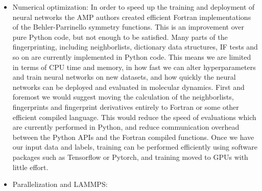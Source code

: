 \begin{itemize}
    \item Numerical optimization:
        In order to speed up the training and deployment of neural
        networks the AMP authors created efficient Fortran implementations
        of the Behler-Parrinello symmetry functions.
        This is an improvement over pure Python code, but not enough to
        be satisfied.
        Many parts of the fingerprinting, including neighborlists,
        dictionary data structures, IF tests and so on are currently
        implemented in Python code. This means we are limited in terms
        of CPU time and memory, in how fast we can alter hyperparameters
        and train neural networks on new datasets, and how quickly
        the neural networks can be deployed and evaluated in molecular dynamics.
        First and foremost we would suggest moving the calculation of
        the neighborlists, fingerprints and fingerprint derivatives entirely
        to Fortran or some other efficient compiled language.
        This would reduce the speed of evaluations which are currently performed
        in Python, and reduce communication overhead between the Python APIs
        and the Fortran compiled functions.
        Once we have our input data and labels, training can be performed
        efficiently using software packages such as Tensorflow or Pytorch,
        and training moved to GPUs with little effort.
    \item Parallelization and LAMMPS:


\end{itemize}
